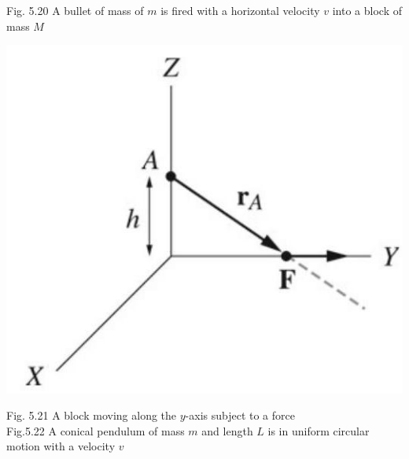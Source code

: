 \documentclass[10pt]{article}
\begin{document}
Fig. 5.20 A bullet of mass of $m$ is fired with a horizontal velocity $v$ into a block of mass $M$

\begin{center}
\includegraphics[max width=\textwidth]{2024_09_13_db1f357d2aad0a03eb2eg-093(4)}
\end{center}

Fig. 5.21 A block moving along the $y$-axis subject to a force\\
Fig.5.22 A conical pendulum of mass $m$ and length $L$ is in uniform circular motion with a velocity $v$
\end{document}
